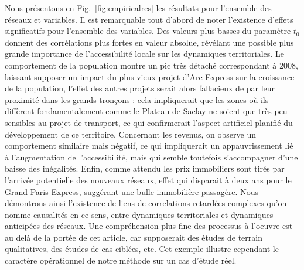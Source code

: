 {}{
Nous présentons en Fig.~\ref{fig:empiricalres} les résultats pour l'ensemble des réseaux et variables. Il est remarquable tout d'abord de noter l'existence d'effets significatifs pour l'ensemble des variables. Des valeurs plus basses du paramètre $t_0$ donnent des corrélations plus fortes en valeur absolue, révélant une possible plus grande importance de l'accessibilité locale sur les dynamiques territoriales. Le comportement de la population montre un pic très détaché correspondant à 2008, laissant supposer un impact du plus vieux projet d'Arc Express sur la croissance de la population, l'effet des autres projets serait alors fallacieux de par leur proximité dans les grands tronçons : cela impliquerait que les zones où ils diffèrent fondamentalement comme le Plateau de Saclay ne soient que très peu sensibles au projet de transport, ce qui confirmerait l'aspect artificiel planifié du développement de ce territoire. Concernant les revenus, on observe un comportement similaire mais négatif, ce qui impliquerait un appauvrissement lié à l'augmentation de l'accessibilité, mais qui semble toutefois s'accompagner d'une baisse des inégalités. Enfin, comme attendu les prix immobiliers sont tirés par l'arrivée potentielle des nouveaux réseaux, effet qui disparait à deux ans pour le Grand Paris Express, suggérant une bulle immobilière passagère. Nous démontrons ainsi l'existence de liens de correlations retardées complexes qu'on nomme causalités en ce sens, entre dynamiques territoriales et dynamiques anticipées des réseaux. Une compréhension plus fine des processus à l'oeuvre est au delà de la portée de cet article, car supposerait des études de terrain qualitatives, des études de cas ciblées, etc. Cet exemple illustre cependant le caractère opérationnel de notre méthode sur un cas d'étude réel.
}




